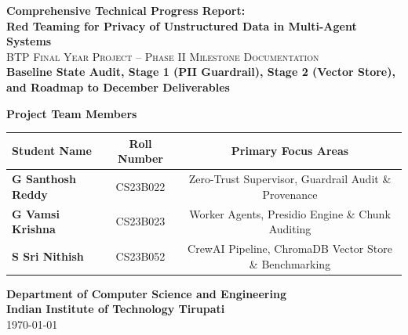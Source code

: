 \documentclass[10pt,a4paper]{article}
\begin{document}
\begin{titlepage}
    \centering
    \vspace*{0.5cm}
    
    {\Huge \bfseries \textcolor{primaryblue}{Comprehensive Technical Progress Report:}}\\[0.4cm]
    {\LARGE \bfseries \textcolor{neutraldark}{Red Teaming for Privacy of Unstructured Data in Multi-Agent Systems}}\\[0.8cm]
    
    {\Large \textsc{BTP Final Year Project -- Phase II Milestone Documentation}}\\[0.4cm]
    {\large \textbf{Baseline State Audit, Stage 1 (PII Guardrail), Stage 2 (Vector Store), and Roadmap to December Deliverables}}\\[1.5cm]

    \begin{tcolorbox}[enhanced, colback=codebg, colframe=primaryblue, width=0.92\textwidth, arc=4mm, boxrule=1.2pt]
        \centering
        \vspace{0.3cm}
        {\large \textbf{Project Team Members}}\\[0.4cm]
        \begin{tabularx}{0.85\textwidth}{X c c}
            \toprule
            \textbf{Student Name} & \textbf{Roll Number} & \textbf{Primary Focus Areas} \\
            \midrule
            \textbf{G Santhosh Reddy} & CS23B022 & Zero-Trust Supervisor, Guardrail Audit \& Provenance \\
            \textbf{G Vamsi Krishna} & CS23B023 & Worker Agents, Presidio Engine \& Chunk Auditing \\
            \textbf{S Sri Nithish} & CS23B052 & CrewAI Pipeline, ChromaDB Vector Store \& Benchmarking \\
            \bottomrule
        \end{tabularx}
        \vspace{0.3cm}
    \end{tcolorbox}

    \vfill

    \begin{center}
        \textbf{Department of Computer Science and Engineering}\\
        \textbf{Indian Institute of Technology Tirupati}\\
        \vspace{0.3cm}
        \today
    \end{center}
    
    \vspace{0.8cm}
\end{titlepage}
\end{document}
